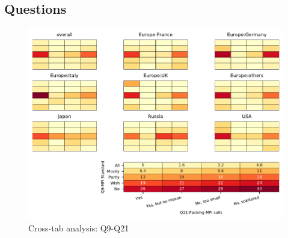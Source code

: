 
\subsection{Questions}


\begin{figure}
\begin{center}
\includegraphics[width=12cm]{../pdfs/Q9-Q21.pdf}
\caption{Cross-tab analysis: Q9-Q21}
\label{fig:Q9-Q21}
\end{center}
\end{figure}
